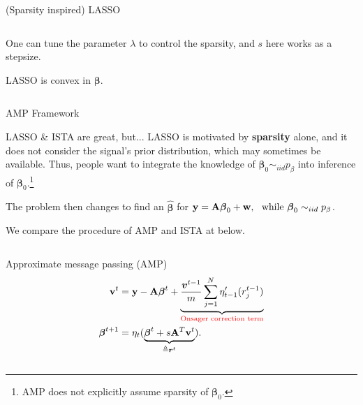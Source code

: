 \documentclass[aspectratio=43, 10pt]{beamer}
\begin{document}
\begin{frame}{(Sparsity inspired) LASSO}
\begin{columns}
\begin{column}{0.3\textwidth}
            \vspace{-3mm}
            One can tune the parameter $\lambda$ to control the sparsity, and $s$ here works as a stepsize. 

            \vspace{3mm}
            LASSO is convex in $\boldsymbol{\beta}$.
        \end{column}
    \end{columns}
\end{frame}

\begin{frame}{AMP Framework}
    \vspace{-3mm}
    \begin{block}{LASSO \& ISTA are great, but...}
        LASSO is motivated by \textbf{sparsity} alone, and it does not consider the signal's prior distribution, which may sometimes be available. Thus, people want to integrate the knowledge of $\boldsymbol{\beta}_0 \sim_{iid} p_{\beta}$ into inference of $\boldsymbol{\beta}_0$.\footnote{AMP does not explicitly assume sparsity of $\boldsymbol{\beta}_0$.} 
    \end{block}

    The problem then changes to find an $\hat{\boldsymbol{\beta}}$ for $\bold{y}= \bold{A} \boldsymbol{\beta}_0 + \bold{w}, ~~ \text{while } \boldsymbol{\beta}_0 \sim_{iid} p_{\beta}$. 


    \pause
    \vspace{0.2cm}
    We compare the procedure of AMP and ISTA at below. 

    \begin{columns}
        \begin{column}{0.5\textwidth}
            \begin{block}{Approximate message passing (AMP)}
                \vspace{-5mm}
                \begin{align}
                    \bold{v}^{t} &= \bold{y} - \bold{A} \boldsymbol{\beta}^t + \underbrace{\frac{\boldsymbol{v}^{t-1}}{m} \sum_{j=1}^N \eta_{t-1}'(r_j^{t-1})}_{\textcolor{red}{\text{Onsager correction term}}} \notag \\ 
                    \boldsymbol{\beta}^{t+1} &= \eta_t( \underbrace{\boldsymbol{\beta}^{t}+s\bold{A}^T \bold{v}^{t}}_{\triangleq \boldsymbol{r}^{t}} ). \notag 
                \end{align}
            \end{block}
        \end{column}


\end{columns}
\end{frame}
\end{document}
